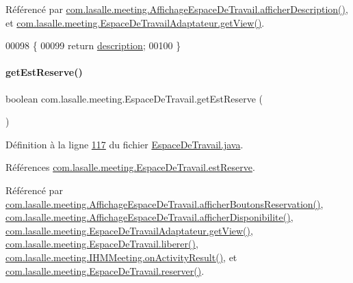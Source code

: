 Référencé par \hyperlink{_affichage_espace_de_travail_8java_source_l00083}{com.\+lasalle.\+meeting.\+Affichage\+Espace\+De\+Travail.\+afficher\+Description()}, et \hyperlink{_espace_de_travail_adaptateur_8java_source_l00040}{com.\+lasalle.\+meeting.\+Espace\+De\+Travail\+Adaptateur.\+get\+View()}.


\begin{DoxyCode}
00098     \{
00099         \textcolor{keywordflow}{return} \hyperlink{classcom_1_1lasalle_1_1meeting_1_1_espace_de_travail_a4633baf86d38c201c7e288fda3604bd7}{description};
00100     \}
\end{DoxyCode}
\mbox{\label{classcom_1_1lasalle_1_1meeting_1_1_espace_de_travail_a69fe30f8d3aff92986f4c39402e16ab0}} 
\paragraph{\texorpdfstring{get\+Est\+Reserve()}{getEstReserve()}}
{\footnotesize\ttfamily boolean com.\+lasalle.\+meeting.\+Espace\+De\+Travail.\+get\+Est\+Reserve (\begin{DoxyParamCaption}{ }\end{DoxyParamCaption})}



Définition à la ligne \hyperlink{_espace_de_travail_8java_source_l00117}{117} du fichier \hyperlink{_espace_de_travail_8java_source}{Espace\+De\+Travail.\+java}.



Références \hyperlink{_espace_de_travail_8java_source_l00038}{com.\+lasalle.\+meeting.\+Espace\+De\+Travail.\+est\+Reserve}.



Référencé par \hyperlink{_affichage_espace_de_travail_8java_source_l00150}{com.\+lasalle.\+meeting.\+Affichage\+Espace\+De\+Travail.\+afficher\+Boutons\+Reservation()}, \hyperlink{_affichage_espace_de_travail_8java_source_l00127}{com.\+lasalle.\+meeting.\+Affichage\+Espace\+De\+Travail.\+afficher\+Disponibilite()}, \hyperlink{_espace_de_travail_adaptateur_8java_source_l00040}{com.\+lasalle.\+meeting.\+Espace\+De\+Travail\+Adaptateur.\+get\+View()}, \hyperlink{_espace_de_travail_8java_source_l00145}{com.\+lasalle.\+meeting.\+Espace\+De\+Travail.\+liberer()}, \hyperlink{_i_h_m_meeting_8java_source_l00297}{com.\+lasalle.\+meeting.\+I\+H\+M\+Meeting.\+on\+Activity\+Result()}, et \hyperlink{_espace_de_travail_8java_source_l00130}{com.\+lasalle.\+meeting.\+Espace\+De\+Travail.\+reserver()}.


